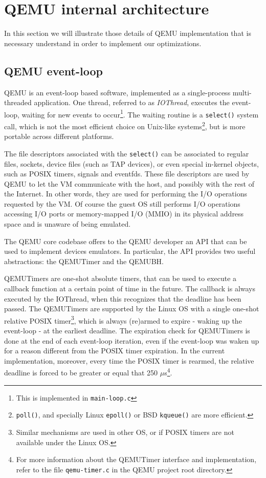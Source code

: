 \section{QEMU internal architecture}
In this section we will illustrate those details of QEMU implementation that is necessary understand in order to implement our
optimizations.

\subsection{QEMU event-loop}
\label{sec:qemuel}
QEMU is an event-loop based software, implemented as a single-process multi-threaded application. 
One thread, referred to as \emph{IOThread}, executes the event-loop, waiting for new events to occur\footnote{This is 
implemented in \texttt{main-loop.c}}.
The waiting routine is a \texttt{select()} system call, which is not the most efficient choice on Unix-like
systems\footnote{ \texttt{poll()}, and specially Linux \texttt{epoll()} or BSD \texttt{kqueue()} are more efficient.},
but is more portable across different platforms.

\vspace{0.5cm}

The file descriptors associated with the \texttt{select()} can be associated to regular files, sockets, device files (such as TAP 
devices), or even special in-kernel objects, such as POSIX timers, signals and eventfds. These file descriptors are used by QEMU to let
the VM communicate with the host, and possibly with the rest of the Internet. In other words, they are used for performing the I/O 
operations requested by the VM. Of course the guest OS still performs I/O operations accessing I/O ports or memory-mapped I/O (MMIO) in 
its physical address space and is unaware of being emulated.

\vspace{0.5cm}

The QEMU core codebase offers to the QEMU developer an API that can be used to implement devices emulators.
In particular, the API provides two useful abstractions: the QEMUTimer and the QEMUBH. 

QEMUTimers are one-shot absolute timers, that can be 
used to execute a callback function at a certain point of time in the future. The callback is always executed by the IOThread, when this
recognizes that the deadline has been passed. The QEMUTimers are supported
by the Linux OS with a single one-shot relative POSIX timer\footnote{Similar mechanisms are used in other OS, or if POSIX timers are not
available under the Linux OS.}, which is always (re)armed to expire - waking up the event-loop - at
the earliest deadline. The expiration check for QEMUTimers is done at the end of each event-loop iteration, even if the event-loop was 
waken up for a reason different from the POSIX timer expiration. In the current implementation, moreover, every time the POSIX timer
is rearmed, the relative deadline is forced to be greater or equal that 250 $\mu$s\footnote{For more information about the QEMUTimer
interface and implementation, refer to the file \texttt{qemu-timer.c} in the QEMU project root directory.}.

